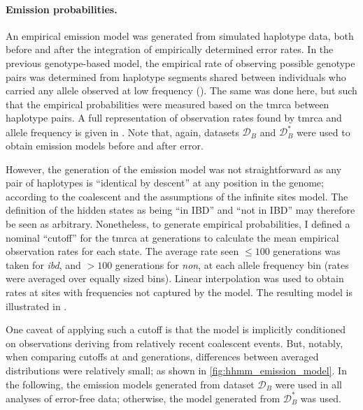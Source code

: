 \paragraph{Emission probabilities.}
An empirical emission model was generated from simulated haplotype data, both before and after the integration of empirically determined error rates.
In the previous genotype-based model, the empirical rate of observing possible genotype pairs was determined from haplotype segments shared between individuals who carried any allele observed at low frequency (\fk{[2,25]}).
The same was done here, but such that the empirical probabilities were measured based on the \gls{tmrca} between haplotype pairs.
A full representation of observation rates found by \gls{tmrca} and allele frequency is given in .
Note that, again, datasets $\mathcal{D}_B$ and $\mathcal{D}_B^{\ast}$ were used to obtain emission models before and after error.

%

%

However, the generation of the emission model was not straightforward as any pair of haplotypes is
“identical by descent” at any position in the genome; according to the coalescent and the assumptions of the infinite sites model.
The definition of the hidden states as being ``in IBD'' and ``not in IBD'' may therefore be seen as arbitrary.
Nonetheless, to generate empirical probabilities,
I defined a nominal ``cutoff'' for the \gls{tmrca} at  generations to calculate the mean empirical observation rates for each state.
The average rate seen ${\leq 100}$ generations was taken for \emph{ibd}, and
$>100$ generations for \emph{non}, at each allele frequency bin (rates were averaged over  equally sized bins).
Linear interpolation was used to obtain rates at sites with frequencies not captured by the model.
The resulting model is illustrated in .

%

%

One caveat of applying such a cutoff is that the model is implicitly conditioned on observations deriving from relatively recent coalescent events.
But, notably, when comparing cutoffs at  and  generations, differences between averaged distributions were relatively small; as shown in \cref{fig:hhmm_emission_model}.
In the following, the emission models generated from dataset $\mathcal{D}_B$ were used in all analyses of error-free data; otherwise, the model generated from $\mathcal{D}_B^{\ast}$ was used.



